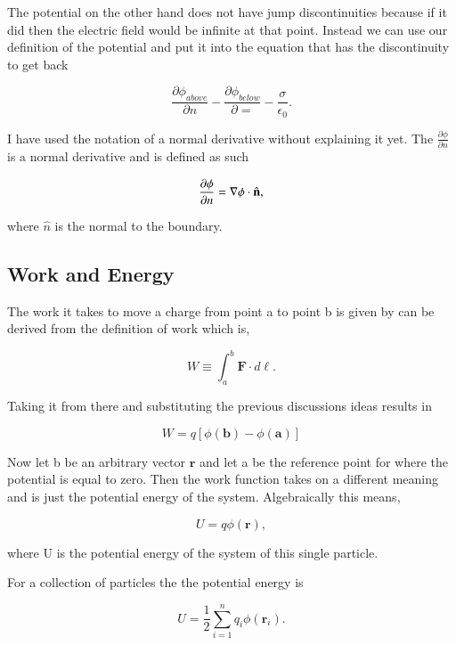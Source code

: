 \documentclass[preprint, review,12pt]{elsarticle}
\def\.{\cdot}
\def\b{\textbf}
\def\bell{\bm{\ell}}
\def\={\equiv}
\newcommand{\pd}[2]{\frac{\partial #1 }{\partial #2}}
\newcommand{\hb}[1]{\hat{\b #1}}
\begin{document}
The potential on the other hand does not have jump discontinuities because if it did then the electric field would be infinite at that point. Instead we can use our definition of the potential and put it into the equation that has the discontinuity to get back

\begin{equation}
    \pd{\phi_{above}}{n} - \pd{\phi_{below}} = -\frac{\sigma}{\epsilon_0}.
\end{equation}

I have used the notation of a normal derivative without explaining it yet. The $\frac{\partial \phi}{\partial n}$ is a normal derivative and is defined as such

\begin{equation}
    \pd{\phi}{n} = \nabla \phi \. \hb{n},
\end{equation}

where $\hat{n}$ is the normal to the boundary. 


\subsection{Work and Energy}

The work it takes to move a charge from point a to point b is given by can be derived from the definition of work which is,

\begin{equation}
    W \= \int_a^b \b{F}\. d\bell.
\end{equation}

Taking it from there and substituting the previous discussions ideas results in

\begin{equation}
    W = q[\phi(\b{b})-\phi(\b{a})]
\end{equation}

Now let b be an arbitrary vector $\b{r}$ and let a be the reference point for where the potential is equal to zero. Then the work function takes on a different meaning and is just the potential energy of the system. Algebraically this means,

\begin{equation}
    U = q\phi(\b{r}),
\end{equation}

where U is the potential energy of the system of this single particle.

For a collection of particles the the potential energy is

\begin{equation}
    U = \frac{1}{2}\sum_{i=1}^n q_i \phi(\b{r}_i).
\end{equation}
\end{document}
